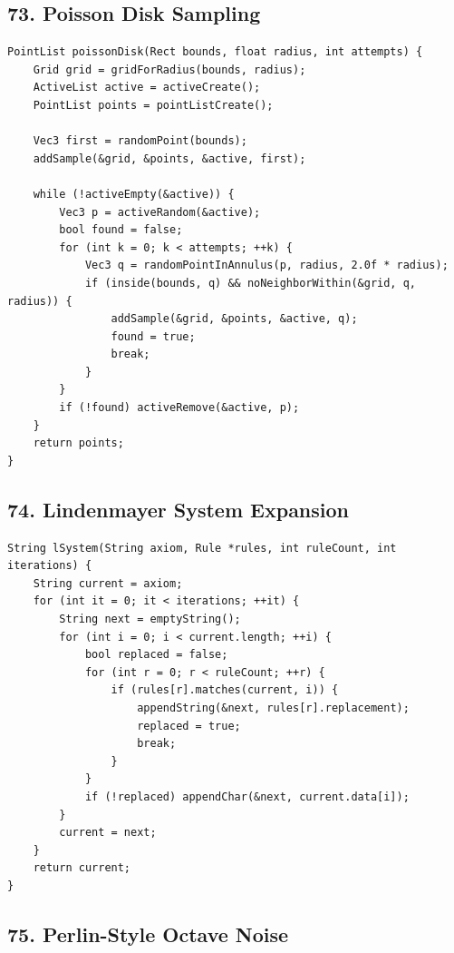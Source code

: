 \documentclass[10pt,letterpaper]{article}
\begin{document}
\subsection*{73. Poisson Disk Sampling}
{}

\begin{verbatim}
PointList poissonDisk(Rect bounds, float radius, int attempts) {
    Grid grid = gridForRadius(bounds, radius);
    ActiveList active = activeCreate();
    PointList points = pointListCreate();

    Vec3 first = randomPoint(bounds);
    addSample(&grid, &points, &active, first);

    while (!activeEmpty(&active)) {
        Vec3 p = activeRandom(&active);
        bool found = false;
        for (int k = 0; k < attempts; ++k) {
            Vec3 q = randomPointInAnnulus(p, radius, 2.0f * radius);
            if (inside(bounds, q) && noNeighborWithin(&grid, q, radius)) {
                addSample(&grid, &points, &active, q);
                found = true;
                break;
            }
        }
        if (!found) activeRemove(&active, p);
    }
    return points;
}
\end{verbatim}

\subsection*{74. Lindenmayer System Expansion}
{}

\begin{verbatim}
String lSystem(String axiom, Rule *rules, int ruleCount, int iterations) {
    String current = axiom;
    for (int it = 0; it < iterations; ++it) {
        String next = emptyString();
        for (int i = 0; i < current.length; ++i) {
            bool replaced = false;
            for (int r = 0; r < ruleCount; ++r) {
                if (rules[r].matches(current, i)) {
                    appendString(&next, rules[r].replacement);
                    replaced = true;
                    break;
                }
            }
            if (!replaced) appendChar(&next, current.data[i]);
        }
        current = next;
    }
    return current;
}
\end{verbatim}

\subsection*{75. Perlin-Style Octave Noise}
{}
\end{document}
